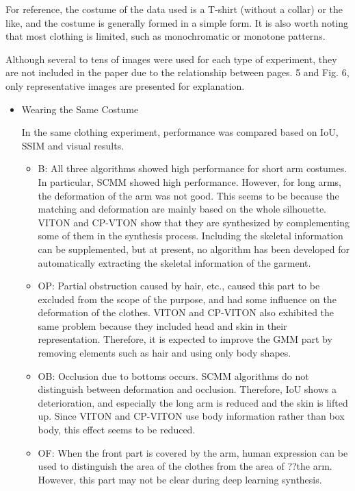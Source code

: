 \documentclass[runningheads]{llncs}
\begin{document}
For reference, the costume of the data used is a T-shirt (without a collar) or the like, and the costume is generally formed in a simple form. It is also worth noting that most clothing is limited, such as monochromatic or monotone patterns.


Although several to tens of images were used for each type of experiment, they are not included in the paper due to the relationship between pages. 5 and Fig. 6, only representative images are presented for explanation.

\begin{itemize}

\item Wearing the Same Costume

In the same clothing experiment, performance was compared based on IoU, SSIM and visual results.

\begin{itemize}

\item B: All three algorithms showed high performance for short arm costumes. In particular, SCMM showed high performance. However, for long arms, the deformation of the arm was not good. This seems to be because the matching and deformation are mainly based on the whole silhouette. VITON and CP-VTON show that they are synthesized by complementing some of them in the synthesis process. Including the skeletal information can be supplemented, but at present, no algorithm has been developed for automatically extracting the skeletal information of the garment.

\item OP: Partial obstruction caused by hair, etc., caused this part to be excluded from the scope of the purpose, and had some influence on the deformation of the clothes. VITON and CP-VITON also exhibited the same problem because they included head and skin in their representation. Therefore, it is expected to improve the GMM part by removing elements such as hair and using only body shapes.
\item OB: Occlusion due to bottoms occurs. SCMM algorithms do not distinguish between deformation and occlusion. Therefore, IoU shows a deterioration, and especially the long arm is reduced and the skin is lifted up. Since VITON and CP-VITON use body information rather than box body, this effect seems to be reduced.


\item OF: When the front part is covered by the arm, human expression can be used to distinguish the area of the clothes from the area of ??the arm. However, this part may not be clear during deep learning synthesis.


\end{itemize}
\end{itemize}
\end{document}
